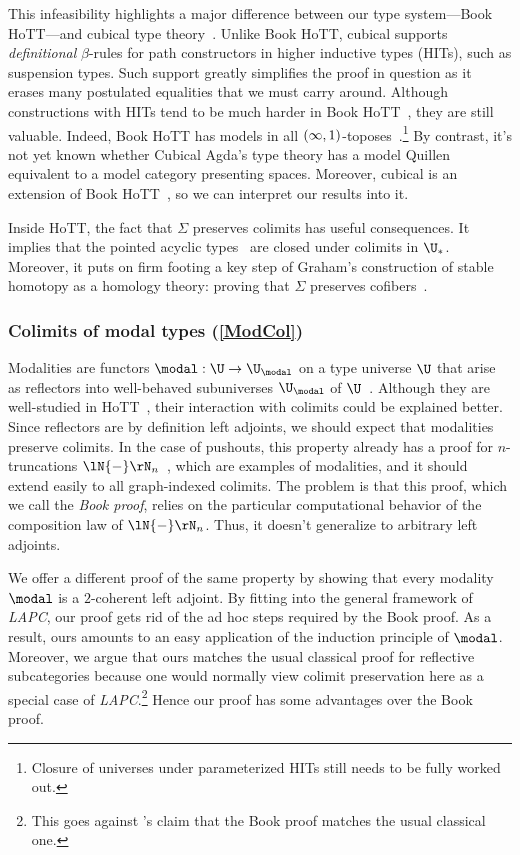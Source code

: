 \documentclass{lmcs}
\theoremstyle{definition}\newtheorem{note}[thm]{Note}
\begin{document}
This infeasibility highlights a major difference between our type system---Book HoTT---and cubical type theory~\cite{cubagda}. Unlike Book HoTT, cubical supports \emph{definitional} $\beta$-rules for path constructors in higher inductive types (HITs), such as suspension types. Such support greatly simplifies the proof in question as it erases many postulated equalities that we must carry around.  Although constructions with HITs tend to be much harder in Book HoTT~\cite{cubsyn}, they are still valuable. Indeed, Book HoTT has models in all $\mleft(\infty,1\mright)$-toposes~\cite{HITsem, topoimod}.\footnote{Closure of universes under parameterized HITs still needs to be fully worked out.} By contrast, it's not yet known whether Cubical Agda's type theory has a model Quillen equivalent to a model category presenting spaces. Moreover, cubical is an extension of Book HoTT~\cite[Section 2.16]{ABCHFL}, so we can interpret our results into it.

Inside HoTT, the fact that $\Sigma$ preserves colimits has useful consequences. It implies that the pointed acyclic types~\cite{acyclic} are closed under colimits in $\U_{\ast}$. Moreover, it puts on firm footing a key step of Graham's construction of stable homotopy as a homology theory: proving that $\Sigma$ preserves cofibers~\cite[Corollary 2.2]{graham}. 

\subsubsection{Colimits of modal types (\autoref{ModCol})} \label{modsum}

Modalities are functors $\modal : \U \to \U_{\modal}$ on a type universe $\U$ that arise as reflectors into well-behaved subuniverses $\U_{\modal}$ of $\U$~\cite{RS}. Although they are well-studied in HoTT~\cite{modaldes, modalchar}, their interaction with colimits could be explained better. Since reflectors are by definition left adjoints, we should expect that modalities preserve colimits.
In the case of pushouts, this property already has a proof for $n$-truncations $\lN{-}\rN_n$~\cite[Section 7.4]{Uni13}, which are examples of modalities, and it should extend easily to all graph-indexed colimits. The problem is that this proof, which we call the \emph{Book proof}, relies on the particular computational behavior of the composition law of $\lN{-}\rN_n$. Thus, it doesn't generalize to arbitrary left adjoints.

We offer a different proof of the same property by showing that every modality $\modal$ is a $2$-coherent left adjoint. By fitting into the general framework of \emph{LAPC}, our proof gets rid of the ad hoc steps required by the Book proof. As a result, ours  amounts to an easy application of the induction principle of $\modal$. Moreover, we argue that ours matches the usual classical proof for reflective subcategories because one would normally view colimit preservation here as a special case of \emph{LAPC}.\footnote{This goes against \cite[Section 7.7]{Uni13}'s claim that the Book proof matches the usual classical one.} Hence our proof has some advantages over the Book proof.
\end{document}
